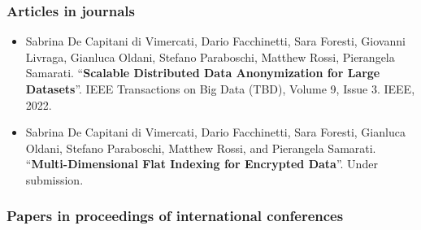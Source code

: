 \subsubsection*{Articles in journals}

\begin{itemize}
    \nocite{scalable-mondrian}
    \item Sabrina De Capitani di Vimercati, Dario Facchinetti, Sara
        Foresti, Giovanni Livraga, Gianluca Oldani, Stefano
        Paraboschi, Matthew Rossi, Pierangela Samarati.
        ``\textbf{Scalable Distributed Data Anonymization for Large
        Datasets}''. IEEE Transactions on Big Data (TBD), Volume 9,
        Issue 3. IEEE, 2022.
    
    \nocite{k-flat}
    \item Sabrina De Capitani di Vimercati, Dario Facchinetti, Sara
        Foresti, Gianluca Oldani, Stefano Paraboschi, Matthew Rossi,
        and Pierangela Samarati. ``\textbf{Multi-Dimensional Flat
        Indexing for Encrypted Data}''. Under submission.
\end{itemize}

\subsubsection*{Papers in proceedings of international conferences}

